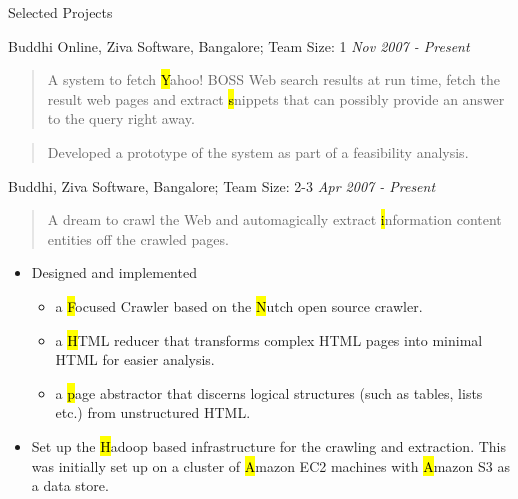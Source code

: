 \documentclass{resume}
\newcommand{\period}{\hfill\small\sl}
\newcommand{\teamsize}{\sc\footnotesize Team Size: }
\begin{document}
\begin{category}{Selected Projects}{}

    \item {\topic Buddhi Online,} Ziva Software, Bangalore;
        {\teamsize 1}
        {\period Nov 2007 - Present}
        \begin{quotation}
            A system to fetch {\hl Yahoo! BOSS} Web search results at run time,
            fetch the result web pages and extract {\hl snippets} that can possibly
            provide an answer to the query right away.
        \end{quotation}
        \begin{quotation}
            Developed a prototype of the system as part of a feasibility analysis.
        \end{quotation}

    \item {\topic Buddhi,} Ziva Software, Bangalore;
        {\teamsize 2-3}
        {\period Apr 2007 - Present}
        \begin{quotation}
            A dream to crawl the Web and automagically extract {\hl information
            content entities} off the crawled pages.
        \end{quotation}

            \begin{itemize}
                \item Designed and implemented
                    \begin{itemize}
                        \item a {\hl Focused Crawler} based on the {\hl Nutch} open
                            source crawler.
                        \item a {\hl HTML reducer} that transforms complex HTML
                            pages into minimal HTML for easier analysis.
                        \item a {\hl page abstractor} that discerns logical
                            structures (such as tables, lists etc.) from
                            unstructured HTML.
                    \end{itemize}
                \item Set up the {\hl Hadoop} based infrastructure for the crawling
                    and extraction.  This was initially set up on a cluster of {\hl
                    Amazon EC2} machines with {\hl Amazon S3} as a data store.
            \end{itemize}


\end{category}
\end{document}
